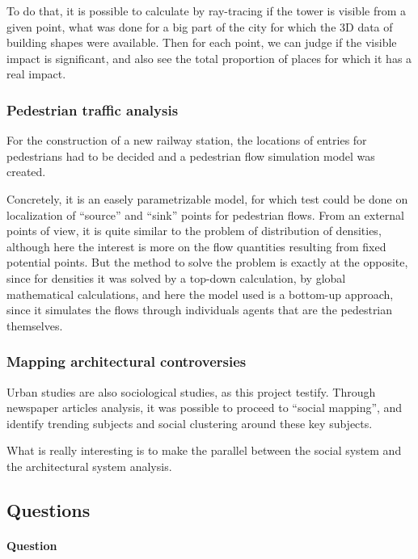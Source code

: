 \documentclass[english]{article}
\begin{document}
\bigskip{}


To do that, it is possible to calculate by ray-tracing if the tower
is visible from a given point, what was done for a big part of the
city for which the 3D data of building shapes were available. Then
for each point, we can judge if the visible impact is significant,
and also see the total proportion of places for which it has a real
impact.


\subsubsection*{Pedestrian traffic analysis}

For the construction of a new railway station, the locations of entries
for pedestrians had to be decided and a pedestrian flow simulation
model was created.

\bigskip{}


Concretely, it is an easely parametrizable model, for which test could
be done on localization of ``source'' and ``sink'' points for
pedestrian flows. From an external points of view, it is quite similar
to the problem of distribution of densities, although here the interest
is more on the flow quantities resulting from fixed potential points.
But the method to solve the problem is exactly at the opposite, since
for densities it was solved by a top-down calculation, by global mathematical
calculations, and here the model used is a bottom-up approach, since
it simulates the flows through individuals agents that are the pedestrian
themselves.


\subsubsection*{Mapping architectural controversies}

Urban studies are also sociological studies, as this project testify.
Through newspaper articles analysis, it was possible to proceed to
``social mapping'', and identify trending subjects and social clustering
around these key subjects.

\bigskip{}


What is really interesting is to make the parallel between the social
system and the architectural system analysis.


\subsection*{Questions}


\paragraph{Question}
\end{document}
